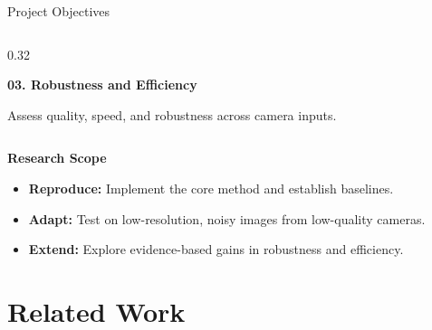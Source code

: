 ﻿\documentclass[
    11pt,%
    aspectratio=169,%
]{beamer}
\begin{document}
\begin{frame}{Project Objectives}
\begin{columns}[T, onlytextwidth]
    \begin{column}{0.32\textwidth}
        \begin{beamercolorbox}[
            rounded=true,
            sep=0.10cm,
            wd=\linewidth
        ]{}
            {\color{orange!85!black}\bfseries 03. Robustness and Efficiency}

            \vspace{0.07cm}

            \fontsize{8.5}{10}\selectfont
            Assess quality, speed, and robustness across camera inputs.
        \end{beamercolorbox}
    \end{column}

\end{columns}

\vspace{0.18cm}

{\color{Navy}\bfseries Research Scope}

\vspace{0.05cm}

\begin{itemize}
    \setlength{\itemsep}{1pt}
    \setlength{\parskip}{0pt}

    \item \textbf{Reproduce:} Implement the core method and establish baselines.

    \item \textbf{Adapt:} Test on low-resolution, noisy images from low-quality cameras.

    \item \textbf{Extend:} Explore evidence-based gains in robustness and efficiency.
\end{itemize}

\end{frame}


\section{Related Work}
\end{document}
